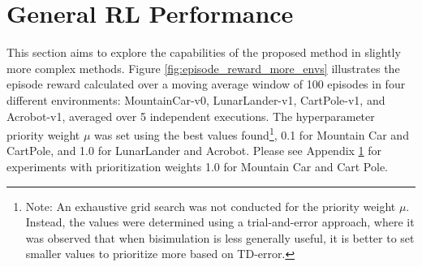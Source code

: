 \section{General RL Performance}

This section aims to explore the capabilities of the proposed method in slightly more complex methods. Figure \ref{fig:episode_reward_more_envs} illustrates the episode reward calculated over a moving average window of 100 episodes in four different environments: MountainCar-v0, LunarLander-v1, CartPole-v1, and Acrobot-v1, averaged over 5 independent executions. The hyperparameter priority weight $\mu$ was set using the best values found\footnote{Note: An exhaustive grid search was not conducted for the priority weight $\mu$. Instead, the values were determined using a trial-and-error approach, where it was observed that when bisimulation is less generally useful, it is better to set smaller values to prioritize more based on TD-error.}, 0.1 for Mountain Car and CartPole, and 1.0 for LunarLander and Acrobot. Please see Appendix \ref{} for experiments with prioritization weights 1.0 for Mountain Car and Cart Pole.

